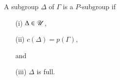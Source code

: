 \setcounter{definition}{15}
\begin{definition}\label{art9-def1.15}
A subgroup $\Delta$ of $\Gamma$ is a $P$-subgroup if
\begin{itemize}
\item[(i)] $\Delta \in \mathscr{U}$,

\item[(ii)] $c (\Delta) = p (\Gamma)$,
 
and 

\item[(iii)] $\Delta$ is full.
\end{itemize}
\end{definition}






\begin{thebibliography}{99}
\end{thebibliography}

